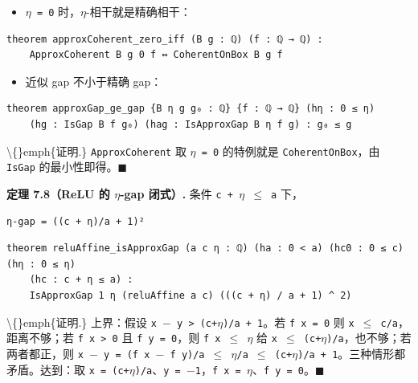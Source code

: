 \documentclass[11pt,a4paper]{ctexart}
\begin{document}
\begin{itemize}
\item \texttt{\ensuremath{\eta} = 0} 时，\ensuremath{\eta}-相干就是精确相干：
\end{itemize}

\begin{lstlisting}
theorem approxCoherent_zero_iff (B g : ℚ) (f : ℚ → ℚ) :
    ApproxCoherent B g 0 f ↔ CoherentOnBox B g f
\end{lstlisting}

\begin{itemize}
\item 近似 gap 不小于精确 gap：
\end{itemize}

\begin{lstlisting}
theorem approxGap_ge_gap {B η g g₀ : ℚ} {f : ℚ → ℚ} (hη : 0 ≤ η)
    (hg : IsGap B f g₀) (hag : IsApproxGap B η f g) : g₀ ≤ g
\end{lstlisting}

\textbackslash\{\}emph\{证明.\} \texttt{ApproxCoherent} 取 \texttt{\ensuremath{\eta} = 0} 的特例就是 \texttt{CoherentOnBox}，由 \texttt{IsGap} 的最小性即得。\ensuremath{\ensuremath{\blacksquare}}

\textbf{定理 7.8（ReLU 的 \ensuremath{\eta}-gap 闭式）.} 条件 \texttt{c + \ensuremath{\eta} \ensuremath{\le} a} 下，

\begin{lstlisting}
η-gap = ((c + η)/a + 1)²
\end{lstlisting}

\begin{lstlisting}
theorem reluAffine_isApproxGap (a c η : ℚ) (ha : 0 < a) (hc0 : 0 ≤ c) (hη : 0 ≤ η)
    (hc : c + η ≤ a) :
    IsApproxGap 1 η (reluAffine a c) (((c + η) / a + 1) ^ 2)
\end{lstlisting}

\textbackslash\{\}emph\{证明.\} 上界：假设 \texttt{x \ensuremath{-} y > (c+\ensuremath{\eta})/a + 1}。若 \texttt{f x = 0} 则 \texttt{x \ensuremath{\le} c/a}，距离不够；若 \texttt{f x > 0} 且 \texttt{f y = 0}，则 \texttt{f x \ensuremath{\le} \ensuremath{\eta}} 给 \texttt{x \ensuremath{\le} (c+\ensuremath{\eta})/a}，也不够；若两者都正，则 \texttt{x \ensuremath{-} y = (f x \ensuremath{-} f y)/a \ensuremath{\le} \ensuremath{\eta}/a \ensuremath{\le} (c+\ensuremath{\eta})/a + 1}。三种情形都矛盾。达到：取 \texttt{x = (c+\ensuremath{\eta})/a}、\texttt{y = \ensuremath{-}1}，\texttt{f x = \ensuremath{\eta}}、\texttt{f y = 0}。\ensuremath{\ensuremath{\blacksquare}}
\end{document}
